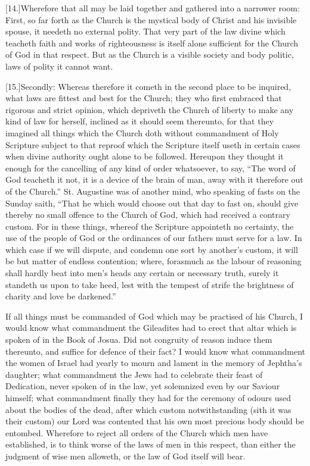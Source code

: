 [14.]Wherefore that all may be laid together and gathered into a narrower room: First, so far forth as the Church is the mystical body of Christ and his invisible spouse, it needeth no external polity. That very part of the law divine which teacheth faith and works of righteousness is itself alone sufficient for the Church of God in that respect. But as the Church is a visible society and body politic, laws of polity it cannot want.

[15.]Secondly: Whereas therefore it cometh in the second place to be inquired, what laws are fittest and best for the Church; they who first embraced that rigorous and strict opinion, which depriveth the Church of liberty to make any kind of law for herself, inclined as it should seem thereunto, for that they imagined all things which the Church doth without commandment of Holy Scripture subject to that reproof which the Scripture itself useth in certain cases when divine authority ought alone to be followed. Hereupon they thought it enough for the cancelling of any kind of order whatsoever, to say, “The word of God teacheth it not, it is a device of  the brain of man, away with it therefore out of the Church.” St. Augustine was of another mind, who speaking of fasts on the Sunday saith, “That he which would choose out that day to fast on, should give thereby no small offence to the Church of God, which had received a contrary custom. For in these things, whereof the Scripture appointeth no certainty, the use of the people of God or the ordinances of our fathers must serve for a law. In which case if we will dispute, and condemn one sort by another’s custom, it will be but matter of endless contention; where, forasmuch as the labour of reasoning shall hardly beat into men’s heads any certain or necessary truth, surely it standeth us upon to take heed, lest with the tempest of strife the brightness of charity and love be darkened.”

If all things must be commanded of God which may be practised of his Church, I would know what commandment the Gileadites had to erect that altar which is spoken of in the Book of Josua. Did not congruity of reason induce them thereunto, and suffice for defence of their fact? I would know what commandment the women of Israel had yearly to mourn and lament in the memory of Jephtha’s daughter; what commandment the Jews had to celebrate their feast of Dedication, never spoken of in the law, yet solemnized even by our Saviour himself; what commandment finally they had for the ceremony of odours used about the bodies of the dead, after which custom notwithstanding (sith it was their custom) our Lord was contented that his own most precious body should be entombed. Wherefore to reject all orders of the Church which men have established, is to think worse of the laws of men in this respect, than either the judgment of wise men alloweth, or the law of God itself will bear.

